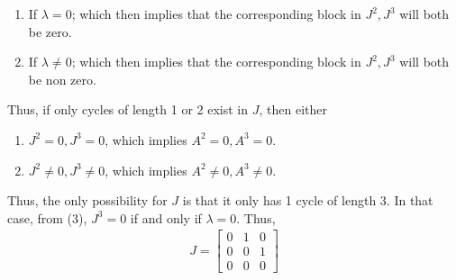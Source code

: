 \documentclass{uofa-eng-assignment}
\begin{document}
\begin{enumerate}
\begin{enumerate}[i]
           \item If $\lambda = 0$; which then implies that the corresponding block in $J^2, J^3$ will both be zero. \\
           \item If $\lambda \neq 0$; which then implies that the corresponding block in $J^2, J^3$ will both be non zero. \\
       \end{enumerate}
	      Thus, if only cycles of length 1 or 2 exist in $J$, then either 
	      \begin{enumerate}[i]
	      	\item $J^2 = 0, J^3 = 0$, which implies $A^2 = 0, A^3 = 0$.
	      	\item $J^2 \neq 0, J^3 \neq 0$, which implies $A^2 \neq 0, A^3 \neq 0$.
	      \end{enumerate} 
	      Thus, the only possibility for $J$ is that it only has 1 cycle of length 3. In that case, from (3), $J^3 = 0$ if and only if $\lambda = 0$. Thus,
	      \begin{align*}
	      	J = \begin{bmatrix}
	      	0 & 1 & 0 \\
	      	0 & 0 & 1 \\
	      	0 & 0 & 0 
	      	\end{bmatrix}
	      \end{align*}
	      

\end{enumerate}
\end{document}
